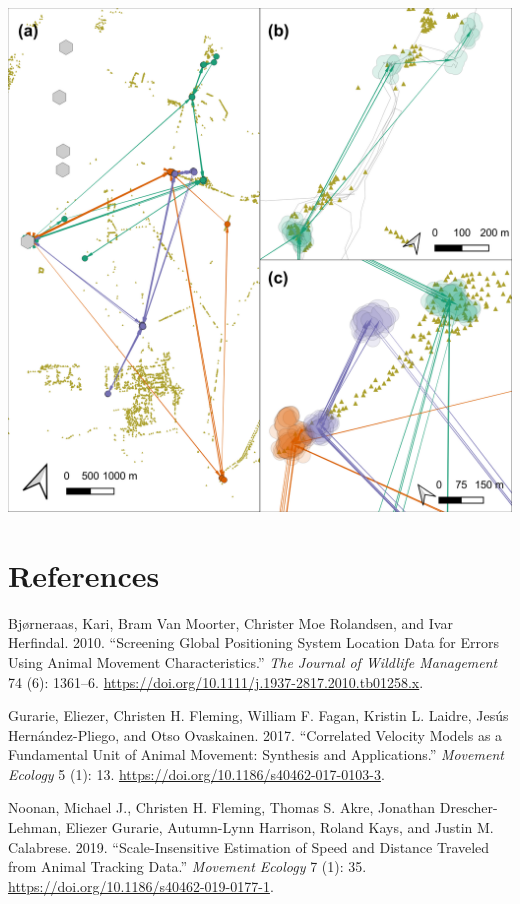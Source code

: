 \documentclass[
]{scrreprt}
\newlength{\cslhangindent}
\newenvironment{cslreferences}%
  {\setlength{\parindent}{0pt}%
  \everypar{\setlength{\hangindent}{\cslhangindent}}\ignorespaces}%
  {\par}
\begin{document}
\includegraphics{figures/fig_bat_patches.png}

\hypertarget{references}{%
\chapter{References}\label{references}}

\hypertarget{refs}{}
\begin{cslreferences}
\leavevmode\hypertarget{ref-bjorneraas2010}{}%
Bjørneraas, Kari, Bram Van Moorter, Christer Moe Rolandsen, and Ivar Herfindal. 2010. ``Screening Global Positioning System Location Data for Errors Using Animal Movement Characteristics.'' \emph{The Journal of Wildlife Management} 74 (6): 1361--6. \url{https://doi.org/10.1111/j.1937-2817.2010.tb01258.x}.

\leavevmode\hypertarget{ref-gurarie2017}{}%
Gurarie, Eliezer, Christen H. Fleming, William F. Fagan, Kristin L. Laidre, Jesús Hernández-Pliego, and Otso Ovaskainen. 2017. ``Correlated Velocity Models as a Fundamental Unit of Animal Movement: Synthesis and Applications.'' \emph{Movement Ecology} 5 (1): 13. \url{https://doi.org/10.1186/s40462-017-0103-3}.

\leavevmode\hypertarget{ref-noonan2019}{}%
Noonan, Michael J., Christen H. Fleming, Thomas S. Akre, Jonathan Drescher-Lehman, Eliezer Gurarie, Autumn-Lynn Harrison, Roland Kays, and Justin M. Calabrese. 2019. ``Scale-Insensitive Estimation of Speed and Distance Traveled from Animal Tracking Data.'' \emph{Movement Ecology} 7 (1): 35. \url{https://doi.org/10.1186/s40462-019-0177-1}.
\end{cslreferences}
\end{document}
